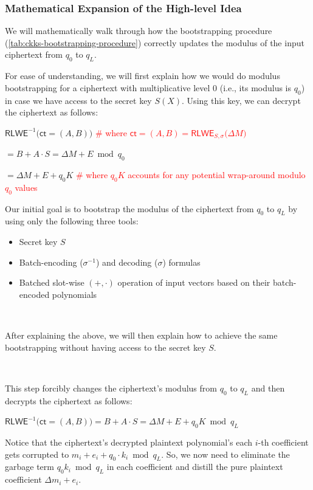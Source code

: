 \subsubsection{Mathematical Expansion of the High-level Idea}
\label{subsubsec:ckks-bootstrapping-high-level-correctness}

We will mathematically walk through how the bootstrapping procedure (\autoref{tab:ckks-bootstrapping-procedure}) correctly updates the modulus of the input ciphertext from $q_0$ to $q_L$. 

For ease of understanding, we will first explain how we would do modulus bootstrapping for a ciphertext with multiplicative level 0 (i.e., its modulus is $q_0$) in case we have access to the secret key $S(X)$. Using this key, we can decrypt the ciphertext as follows:

$\textsf{RLWE}^{-1}\textbf{(}\textsf{ct} = (A, B)\textbf{)}$ \textcolor{red}{ \# where $\textsf{ct}=(A, B) = \textsf{RLWE}_{S, \sigma}\bm(\Delta M \bm)$}

$ = B + A\cdot S = \Delta M + E \bmod q_0$ 

$ = \Delta M + E + q_0K$ \textcolor{red}{\# where $q_0K$ accounts for any potential wrap-around modulo $q_0$ values}

Our initial goal is to bootstrap the modulus of the ciphertext from $q_0$ to $q_L$ by using only the following three tools:

\begin{itemize}
\item Secret key $S$
\item Batch-encoding ($\sigma^{-1}$) and decoding ($\sigma$) formulas
\item Batched slot-wise $(+, \cdot)$ operation of input vectors based on their batch-encoded polynomials
\end{itemize}

$ $

After explaining the above, we will then explain how to achieve the same bootstrapping without having access to the secret key $S$. 


$ $

 This step forcibly changes the ciphertext's modulus from $q_0$ to $q_L$ and then decrypts the ciphertext as follows:

$\textsf{RLWE}^{-1}\textbf{(}\textsf{ct} = (A, B)\textbf{)} = B + A\cdot S = \Delta M + E + q_0 K \bmod q_L$

Notice that the ciphertext's decrypted plaintext polynomial's each $i$-th coefficient gets corrupted to $m_i + e_i + q_0\cdot k_i \bmod q_L$. So, we now need to eliminate the garbage term $q_0k_i \bmod q_L$ in each coefficient and distill the pure plaintext coefficient $\Delta m_i + e_i$. 

